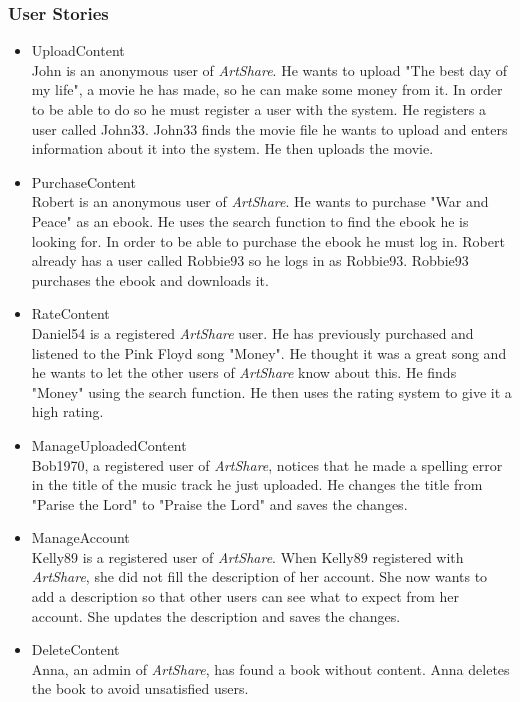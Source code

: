 \subsubsection{User Stories}
\label{sec:User Stories}
\begin{itemize}
\item UploadContent \\
John is an anonymous user of \textit{ArtShare}. He wants to upload "The best day of my life", a movie he has made, so he can make some money from it. In order to be able to do so he must register a user with the system. He registers a user called John33. John33 finds the movie file he wants to upload and enters information about it into the system. He then uploads the movie.
\item PurchaseContent \\
Robert is an anonymous user of \textit{ArtShare}. He wants to purchase "War and Peace" as an ebook. He uses the search function to find the ebook he is looking for. In order to be able to purchase the ebook he must log in. Robert already has a user called Robbie93 so he logs in as Robbie93. Robbie93 purchases the ebook and downloads it.
\item RateContent \\
Daniel54 is a registered \textit{ArtShare} user. He has previously purchased and listened to the Pink Floyd song "Money". He thought it was a great song and he wants to let the other users of \textit{ArtShare} know about this. He finds "Money" using the search function. He then uses the rating system to give it a high rating.
\item ManageUploadedContent \\
Bob1970, a registered user of \textit{ArtShare}, notices that he made a spelling error in the title of the music track he just uploaded. He changes the title from "Parise the Lord" to "Praise the Lord" and saves the changes.
\item ManageAccount \\
Kelly89 is a registered user of \textit{ArtShare}. When Kelly89 registered with \textit{ArtShare}, she did not fill the description of her account. She now wants to add a description so that other users can see what to expect from her account. She updates the description and saves the changes.
\item DeleteContent \\
Anna, an admin of \textit{ArtShare}, has found a book without content. Anna deletes the book to avoid unsatisfied users.
\end{itemize}

%